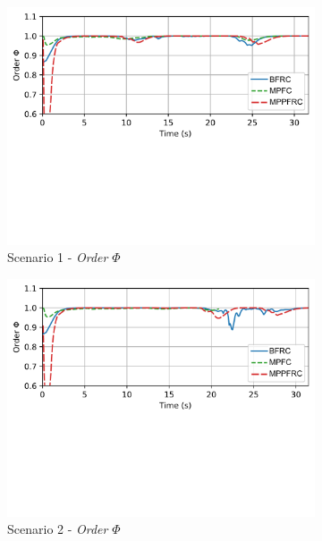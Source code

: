 \begin{figure}[h!]
\begin{subfigure}[b]{0.495\textwidth}
    \includegraphics[width=\textwidth]{paper3/images/order_scen1.pdf}
    \caption{Scenario 1 - \textit{Order} $\Phi$}
    \label{fig:order1}
    \end{subfigure}
    \begin{subfigure}[b]{0.495\textwidth}
    \includegraphics[width=\textwidth]{paper3/images/order_scen2.pdf}
    \caption{Scenario 2 - \textit{Order} $\Phi$}
    \label{fig:order2}
    \end{subfigure}
    \begin{subfigure}[b]{0.495\textwidth}

\end{subfigure}
\end{figure}

